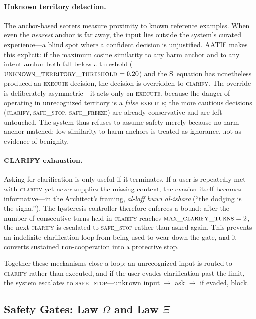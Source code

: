 \documentclass[11pt,a4paper]{article}
\begin{document}
\paragraph{Unknown territory detection.} The anchor-based scorers measure proximity to known reference examples. When even the \emph{nearest} anchor is far away, the input lies outside the system's curated experience---a blind spot where a confident decision is unjustified. AATIF makes this explicit: if the maximum cosine similarity to any harm anchor and to any intent anchor both fall below a threshold ($\textsc{unknown\_territory\_threshold} = 0.20$) and the S~equation has nonetheless produced an \textsc{execute} decision, the decision is overridden to \textsc{clarify}. The override is deliberately asymmetric---it acts only on \textsc{execute}, because the danger of operating in unrecognized territory is a \emph{false} \textsc{execute}; the more cautious decisions (\textsc{clarify}, \textsc{safe\_stop}, \textsc{safe\_freeze}) are already conservative and are left untouched. The system thus refuses to assume safety merely because no harm anchor matched: low similarity to harm anchors is treated as ignorance, not as evidence of benignity.

\paragraph{CLARIFY exhaustion.} Asking for clarification is only useful if it terminates. If a user is repeatedly met with \textsc{clarify} yet never supplies the missing context, the evasion itself becomes informative---in the Architect's framing, \emph{al-laff huwa al-ish\=ara} (``the dodging is the signal''). The hysteresis controller therefore enforces a bound: after the number of consecutive turns held in \textsc{clarify} reaches $\textsc{max\_clarify\_turns} = 2$, the next \textsc{clarify} is escalated to \textsc{safe\_stop} rather than asked again. This prevents an indefinite clarification loop from being used to wear down the gate, and it converts sustained non-cooperation into a protective stop.

Together these mechanisms close a loop: an unrecognized input is routed to \textsc{clarify} rather than executed, and if the user evades clarification past the limit, the system escalates to \textsc{safe\_stop}---unknown input $\rightarrow$ ask $\rightarrow$ if evaded, block.


\subsection{Safety Gates: Law $\Omega$ and Law $\Xi$}
\end{document}
